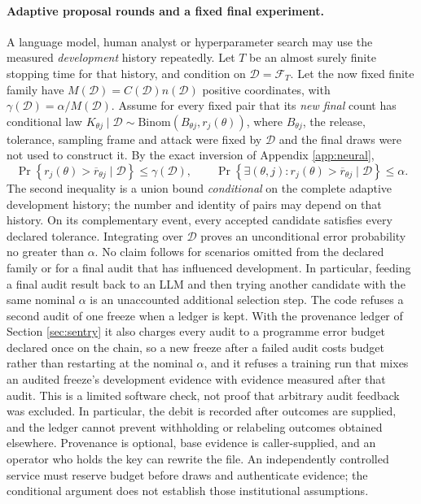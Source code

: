 \paragraph{Adaptive proposal rounds and a fixed final experiment.}
A language model, human analyst or hyperparameter search may use the measured
\emph{development} history repeatedly. Let $T$ be an almost surely finite
stopping time for that history, and condition on $\mathcal D=\mathcal F_T$.
Let the now fixed finite family have $M(\mathcal D)=C(\mathcal D)n(\mathcal D)$
positive coordinates, with $\gamma(\mathcal D)=\alpha/M(\mathcal D)$.
Assume for every fixed pair that its \emph{new final} count has conditional
law
$K_{\theta j}\mid\mathcal D\sim\mathrm{Binom}(B_{\theta j},r_j(\theta))$,
where $B_{\theta j}$, the release, tolerance, sampling frame and attack were
fixed by $\mathcal D$ and the final draws were not used to construct it.
By the exact inversion of Appendix \ref{app:neural},
\begin{equation}
 \Pr\!\left\{r_j(\theta)>\overline r_{\theta j}\mid\mathcal D\right\}
 \leq\gamma(\mathcal D),\qquad
 \Pr\!\left\{\exists(\theta,j):r_j(\theta)>\overline r_{\theta j}
               \mid\mathcal D\right\}\leq\alpha.
 \label{eq:sentry-adaptive-development}
\end{equation}
The second inequality is a union bound \emph{conditional} on the complete
adaptive development history; the number and identity of pairs may depend on
that history. On its complementary event, every accepted candidate satisfies
every declared tolerance. Integrating over $\mathcal D$ proves an
unconditional error probability no greater than $\alpha$. No claim follows
for scenarios omitted from the declared family or for a final audit that has
influenced development. In particular, feeding a final audit result back to
an LLM and then trying another candidate with the same nominal $\alpha$
is an unaccounted additional selection step. The code refuses a second audit
of one freeze when a ledger is kept. With the provenance ledger of
Section \ref{sec:sentry} it also charges every audit to a programme error
budget declared once on the chain, so a new freeze after a failed audit costs
budget rather than restarting at the nominal $\alpha$, and it refuses a
training run that mixes an audited freeze's development evidence with evidence
measured after that audit. This is a limited software check, not proof that
arbitrary audit feedback was excluded. In particular, the debit is recorded
after outcomes are supplied, and the ledger cannot prevent withholding or
relabeling outcomes obtained elsewhere. Provenance is optional, base evidence
is caller-supplied, and an operator who holds the key can rewrite the file.
An independently controlled service must reserve budget before draws and
authenticate evidence; the conditional argument does not establish those
institutional assumptions.

